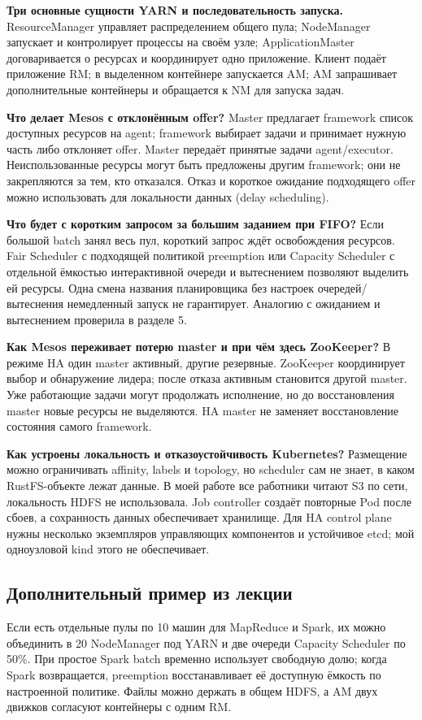 \documentclass[10pt,a4paper]{article}
\begin{document}
\textbf{Три основные сущности YARN и последовательность запуска.}
ResourceManager управляет распределением общего пула; NodeManager
запускает и контролирует процессы на своём узле; ApplicationMaster
договаривается о ресурсах и координирует одно приложение. Клиент подаёт
приложение RM; в выделенном контейнере запускается AM; AM запрашивает
дополнительные контейнеры и обращается к NM для запуска задач.

\textbf{Что делает Mesos с отклонённым offer?}
Master предлагает framework список доступных ресурсов на agent;
framework выбирает задачи и принимает нужную часть либо отклоняет offer.
Master передаёт принятые задачи agent/executor. Неиспользованные ресурсы
могут быть предложены другим framework; они не закрепляются за тем,
кто отказался. Отказ и короткое ожидание подходящего offer можно
использовать для локальности данных (delay scheduling).

\textbf{Что будет с коротким запросом за большим заданием при FIFO?}
Если большой batch занял весь пул, короткий запрос ждёт освобождения
ресурсов. Fair Scheduler с подходящей политикой preemption или
Capacity Scheduler с отдельной ёмкостью интерактивной очереди и
вытеснением позволяют выделить ей ресурсы. Одна смена названия
планировщика без настроек очередей/вытеснения немедленный запуск не
гарантирует. Аналогию с ожиданием и вытеснением проверила в разделе 5.

\textbf{Как Mesos переживает потерю master и при чём здесь ZooKeeper?}
В режиме HA один master активный, другие резервные. ZooKeeper
координирует выбор и обнаружение лидера; после отказа активным становится
другой master. Уже работающие задачи могут продолжать исполнение, но
до восстановления master новые ресурсы не выделяются. HA master не
заменяет восстановление состояния самого framework.

\textbf{Как устроены локальность и отказоустойчивость Kubernetes?}
Размещение можно ограничивать affinity, labels и topology, но scheduler
сам не знает, в каком RustFS-объекте лежат данные. В моей работе все
работники читают S3 по сети, локальность HDFS не использовала.
Job controller создаёт повторные Pod после сбоев, а сохранность данных
обеспечивает хранилище. Для HA control plane нужны несколько экземпляров
управляющих компонентов и устойчивое etcd; мой одноузловой kind этого не
обеспечивает.

\subsection*{Дополнительный пример из лекции}
Если есть отдельные пулы по 10 машин для MapReduce и Spark, их можно
объединить в 20 NodeManager под YARN и две очереди Capacity Scheduler по
50\%. При простое Spark batch временно использует свободную долю; когда
Spark возвращается, preemption восстанавливает её доступную ёмкость
по настроенной политике. Файлы можно держать в общем HDFS, а AM двух
движков согласуют контейнеры с одним RM.
\end{document}

